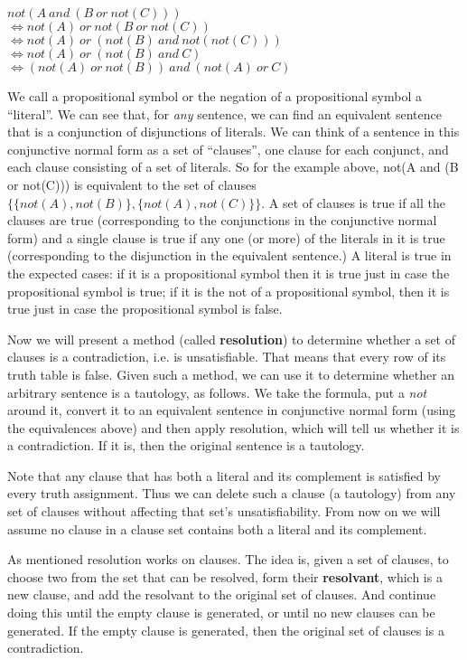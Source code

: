 $not(A~and~(B~or~not(C))) $ \\
$\Longleftrightarrow not(A)~or~not(B~or~not(C))$ \\
$\Longleftrightarrow not(A)~or~(not(B)~and~not(not(C)))$ \\
$\Longleftrightarrow not(A)~or~(not(B)~and~C)$ \\
$\Longleftrightarrow (not(A)~or~not(B))~and~(not(A)~or~C)$

We call a propositional symbol or the negation of a propositional
symbol a ``literal''.  We can see that, for {\em any} sentence, we can
find an equivalent sentence that is a conjunction of disjunctions of
literals.  We can think of a sentence in this conjunctive normal form
as a set of ``clauses'', one clause for each conjunct, and each clause
consisting of a set of literals.  So for the example above, not(A and
(B or not(C))) is equivalent to the set of clauses
$\{\{not(A),not(B)\},\{not(A),not(C)\}\}$.  A set of clauses is true if all
the clauses are true (corresponding to the conjunctions in the
conjunctive normal form) and a single clause is true if any one (or
more) of the literals in it is true (corresponding to the disjunction
in the equivalent sentence.)  A literal is true in the expected cases:
if it is a propositional symbol then it is true just in case the
propositional symbol is true; if it is the not of a propositional
symbol, then it is true just in case the propositional symbol is
false.

Now we will present a method (called {\bf resolution}) to determine
whether a set of clauses is a contradiction, i.e. is unsatisfiable.
That means that every row of its truth table is false.  Given such a
method, we can use it to determine whether an arbitrary sentence is a
tautology, as follows.  We take the formula, put a {\em not} around it,
convert it to an equivalent sentence in conjunctive normal form (using
the equivalences above) and then apply resolution, which will tell us
whether it is a contradiction.  If it is, then the original sentence
is a tautology.

Note that any clause that has both a literal and its complement is
satisfied by every truth assignment.  Thus we can delete such a clause
(a tautology) from any set of clauses without affecting that set's
unsatisfiability.  From now on we will assume no clause in a clause
set contains both a literal and its complement.

As mentioned resolution works on clauses.  The idea is, given a set of
clauses, to choose two from the set that can be resolved, form their
{\bf resolvant}, which is a new clause, and add the resolvant to the
original set of clauses.  And continue doing this until the empty
clause is generated, or until no new clauses can be generated.  If the
empty clause is generated, then the original set of clauses is a
contradiction.

